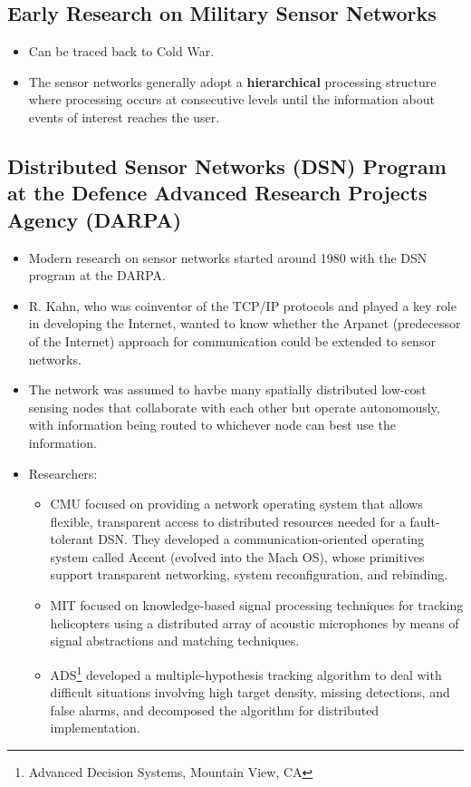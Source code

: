 \documentclass[letterpaper,10pt]{article}
\begin{document}
\subsection{Early Research on Military Sensor Networks}

\begin{itemize}
	\item Can be traced back to Cold War.
	\item The sensor networks generally adopt a \textbf{hierarchical} processing structure where processing occurs at consecutive levels until the information about events of interest reaches the user.
\end{itemize}

\subsection{Distributed Sensor Networks (DSN) Program at the Defence Advanced Research Projects Agency (DARPA)}

\begin{itemize}
	\item Modern research on sensor networks started around 1980 with the DSN program at the DARPA.
	\item R. Kahn, who was coinventor of the TCP/IP protocols and played a key role in developing the Internet, wanted to know whether the Arpanet (predecessor of the Internet) approach for communication could be extended to sensor networks.
	\item The network was assumed to havbe many spatially distributed low-cost sensing nodes that collaborate with each other but operate autonomously, with information being routed to whichever node can best use the information.
	\item Researchers:
	\begin{itemize}
		\item CMU focused on providing a network operating system that allows flexible, transparent access to distributed resources needed for a fault-tolerant DSN. They developed a communication-oriented operating system called Accent (evolved into the Mach OS), whose primitives support transparent networking, system reconfiguration, and rebinding.
		\item MIT focused on knowledge-based signal processing techniques for tracking helicopters using a distributed array of acoustic microphones by means of signal abstractions and matching techniques.
		\item ADS\footnote{Advanced Decision Systems, Mountain View, CA} developed a multiple-hypothesis tracking algorithm to deal with difficult situations involving high target density, missing detections, and false alarms, and decomposed the algorithm for distributed implementation.
	\end{itemize}
\end{itemize}
\end{document}
